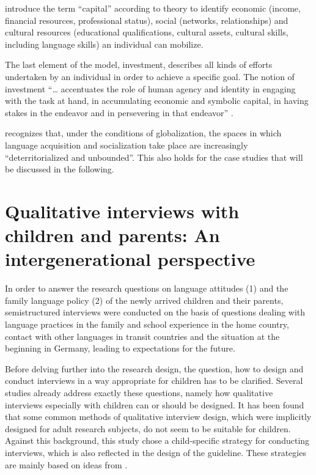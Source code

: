 \documentclass[output=paper,colorlinks,citecolor=brown]{langscibook}
\begin{document}
\citet{darvin_norton2015} introduce the term ``capital'' according to  theory to identify economic (income, financial resources, professional status), social (networks, relationships) and cultural resources (educational qualifications, cultural assets, cultural skills, including language skills) an individual can mobilize.

The last element of the model, investment, \citet{darvin_norton2015} describes all kinds of efforts undertaken by an individual in order to achieve a specific goal. The notion of investment ``… accentuates the role of human agency and identity in engaging with the task at hand, in accumulating economic and symbolic capital, in having stakes in the endeavor and in persevering in that endeavor'' \citep{kramsch2013}.

\citet{darvin_norton2015} recognizes that, under the conditions of globalization, the spaces in which language acquisition and socialization take place are increasingly ``deterritorialized and unbounded''. This also holds for the case studies that will be discussed in the following. 

\section{Qualitative interviews with children and parents: An intergenerational perspective}\label{ch2.5.ss.3}

In order to answer the research questions on language attitudes (1) and the family language policy (2) of the newly arrived children and their parents, semistructured interviews were conducted on the basis of questions dealing with language practices in the family and school experience in the home country, contact with other languages in transit countries and the situation at the beginning in Germany, leading to expectations for the future.

Before delving further into the research design, the question, how to design and conduct interviews in a way appropriate for children has to be clarified. Several studies already address exactly these questions, namely how qualitative interviews especially with children can or should be designed. It has been found that some common methods of qualitative interview design, which were implicitly designed for adult research subjects, do not seem to be suitable for children. Against this background, this study chose a child-specific strategy for conducting interviews, which is also reflected in the design of the guideline. These strategies are mainly based on ideas from \citet{delfos2008}.
\end{document}
